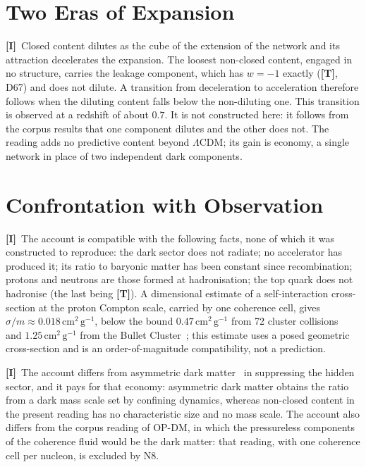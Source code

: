 \documentclass[11pt,a4paper]{article}
\theoremstyle{plain}
\theoremstyle{definition}
\theoremstyle{remark}
\newcommand{\statT}{\textbf{[T]}}
\newcommand{\statI}{\textbf{[I]}}
\begin{document}
\section{Two Eras of Expansion}
\label{sec:eras}

\statI\ Closed content dilutes as the cube of the extension of the network and its attraction decelerates the expansion. The loosest non-closed content, engaged in no structure, carries the leakage component, which has $w=-1$ exactly (\statT, D67) and does not dilute. A transition from deceleration to acceleration therefore follows when the diluting content falls below the non-diluting one. This transition is observed at a redshift of about $0.7$. It is not constructed here: it follows from the corpus results that one component dilutes and the other does not. The reading adds no predictive content beyond $\Lambda$CDM; its gain is economy, a single network in place of two independent dark components.

\section{Confrontation with Observation}
\label{sec:confrontation}

\statI\ The account is compatible with the following facts, none of which it was constructed to reproduce: the dark sector does not radiate; no accelerator has produced it; its ratio to baryonic matter has been constant since recombination; protons and neutrons are those formed at hadronisation; the top quark does not hadronise (the last being \statT). A dimensional estimate of a self-interaction cross-section at the proton Compton scale, carried by one coherence cell, gives $\sigma/m\approx0.018\,\mathrm{cm^2\,g^{-1}}$, below the bound $0.47\,\mathrm{cm^2\,g^{-1}}$ from 72 cluster collisions~\citep{Harvey2015} and $1.25\,\mathrm{cm^2\,g^{-1}}$ from the Bullet Cluster~\citep{Randall2008}; this estimate uses a posed geometric cross-section and is an order-of-magnitude compatibility, not a prediction.

\statI\ The account differs from asymmetric dark matter~\citep{Petraki2013,Zurek2014} in suppressing the hidden sector, and it pays for that economy: asymmetric dark matter obtains the ratio from a dark mass scale set by confining dynamics, whereas non-closed content in the present reading has no characteristic size and no mass scale. The account also differs from the corpus reading of OP-DM, in which the pressureless components of the coherence fluid would be the dark matter: that reading, with one coherence cell per nucleon, is excluded by N8.
\end{document}
